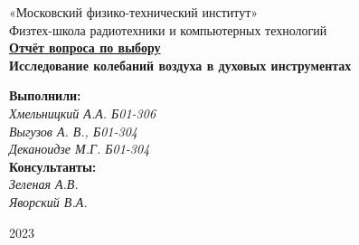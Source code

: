 \pagecolor{white}


\pagestyle{fancy}
\fancyhead{}
\fancyfoot[C]{\color{mycolor} \textit{\leftmark}}
\renewcommand{\headrulewidth}{0pt}
\fancypagestyle{plain}{
  \renewcommand{\headrulewidth}{0pt}
}


\thispagestyle{empty}

\begin{center}
\large{«Московский физико-технический институт»} \\  
\large{Физтех-школа радиотехники и компьютерных технологий }\\
\vspace*{6cm}
{\bfseries
    {\Huge \underline{Отчёт вопроса по выбору} \\ \vspace*{1cm} Исследование колебаний воздуха в духовых инструментах}
}
\end{center}

\vspace*{1cm}
\begin{flushright}
    \large{
    \textbf{Выполнили:} \\ \textit{Хмельницкий А.А. Б01-306 \\ Выгузов А. В., Б01-304 \\ Деканоидзе М.Г. Б01-304} \\
    \textbf{Консультанты:} \\ \textit{Зеленая А.В. \\ Яворский В.А.}
    }
\end{flushright}

\vspace*{9cm}
\begin{center}
2023
\end{center}

\newpage